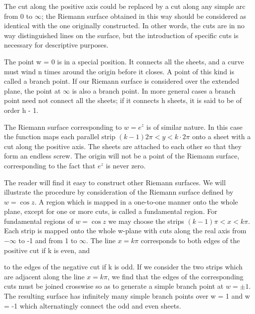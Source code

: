 The cut along the positive axis could be replaced by a cut along any simple arc from 0 to $\infty$; the Riemann surface obtained in this way should be considered as identical with the one originally constructed. In other words, the cuts are in no way distinguished lines on the surface, but the introduction of specific cuts is necessary for descriptive purposes.

The point w = 0 is in a special position. It connects all the sheets, and a curve must wind n times around the origin before it closes. A point of this kind is called a branch point. If our Riemann surface is considered over the extended plane, the point at $\infty$ is also a branch point. In more general cases a branch point need not connect all the sheets; if it connects h sheets, it is said to be of order h - 1.

The Riemann surface corresponding to $w = e^{z}$ is of similar nature. In this case the function maps each parallel strip $(k - 1)2\pi < y < k \cdot 2\pi$ onto a sheet with a cut along the positive axis. The sheets are attached to each other so that they form an endless screw. The origin will not be a point of the Riemann surface, corresponding to the fact that $e^{z}$ is never zero.

The reader will find it easy to construct other Riemann surfaces. We will illustrate the procedure by consideration of the Riemann surface defined by $w = \cos z$. A region which is mapped in a one-to-one manner onto the whole plane, except for one or more cuts, is called a fundamental region. For fundamental regions of $w = \cos z$ we may choose the strips $(k - 1)\pi < x < k\pi$. Each strip is mapped onto the whole w-plane with cuts along the real axis from $-\infty$ to -1 and from 1 to $\infty$. The line $x = k\pi$ corresponds to both edges of the positive cut if k is even, and


to the edges of the negative cut if k is odd. If we consider the two strips which are adjacent along the line $x = k\pi$, we find that the edges of the corresponding cuts must be joined crosswise so as to generate a simple branch point at $w = \pm1$. The resulting surface has infinitely many simple branch points over w = 1 and w = -1 which alternatingly connect the odd and even sheets.


